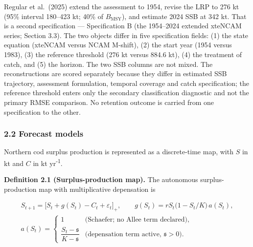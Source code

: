 \documentclass[11pt]{article}
\begin{document}
Regular et al.~(2025) extend the assessment to 1954, revise the LRP to
276 kt (95\% interval 180--423 kt; 40\% of \(B_{\mathrm{MSY}}\)), and
estimate 2024 SSB at 342 kt. That is a second specification ---
Specification B (the 1954--2024 extended xteNCAM series; Section 3.3).
The two objects differ in five specification fields: (1) the state
equation (xteNCAM versus NCAM M-shift), (2) the start year (1954 versus
1983), (3) the reference threshold (276 kt versus 884.6 kt), (4) the
treatment of catch, and (5) the horizon.
The two SSB columns are not mixed. The reconstructions are scored separately because they differ in
estimated SSB trajectory, assessment formulation, temporal coverage and
catch specification; the reference threshold enters only the secondary
classification diagnostic and not the primary RMSE comparison. No
retention outcome is carried from one specification to the other.

\subsubsection{2.2 Forecast models}\label{forecast-models}

Northern cod surplus production is represented as a discrete-time map,
with \(S\) in kt and \(C\) in kt yr\textsuperscript{-1}.

\textbf{Definition 2.1 (Surplus-production map).} The autonomous
surplus-production map with multiplicative depensation is

\[
\begin{gathered}
S_{t+1}=\bigl[S_t+g(S_t)-C_t+\varepsilon_t\bigr]_+,
\qquad
g(S_t)=rS_t\bigl(1-S_t/K\bigr)\,a(S_t),
\\
a(S_t)=
\begin{cases}
1 & \text{(Schaefer; no Allee term declared)},\\[2pt]
\dfrac{S_t-\mathfrak s}{K-\mathfrak s} & \text{(depensation term active, $\mathfrak s>0$)}.
\end{cases}
\end{gathered}
\]
\end{document}
